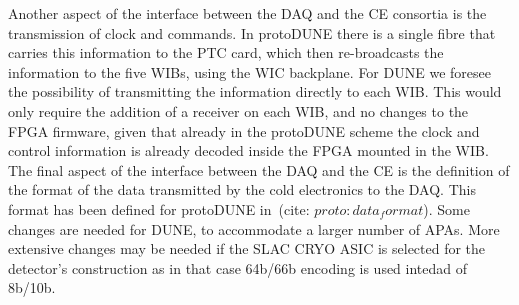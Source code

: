 Another aspect of the interface between the DAQ and the CE consortia is the
transmission of clock and commands. In protoDUNE there is a single fibre
that carries this information to the PTC card, which then re-broadcasts
the information to the five WIBs, using the WIC backplane. For DUNE we
foresee the possibility of transmitting the information directly to each
WIB. This would only require the addition of a receiver on each WIB, and
no changes to the FPGA firmware, given that already in the protoDUNE scheme
the clock and control information is already decoded inside the FPGA mounted
in the WIB. The final aspect of the interface between the DAQ and the CE is
the definition of the format of the data transmitted by the cold electronics
to the DAQ. This format has been defined for protoDUNE in~(cite: $proto:data_format$).
Some changes are needed for DUNE, to accommodate a larger number of APAs.
More extensive changes may be needed if the SLAC CRYO ASIC is selected for
the detector's construction as in that case 64b/66b encoding is used intedad
of 8b/10b.

